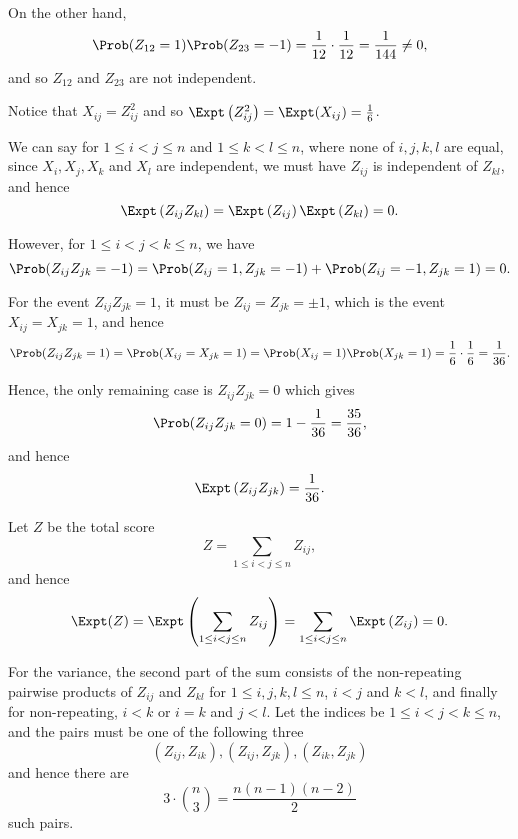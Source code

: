 \begin{enumerate}
          On the other hand,
          \[
              \Prob(Z_{12} = 1) \Prob(Z_{23} = -1) = \frac{1}{12} \cdot \frac{1}{12} = \frac{1}{144} \neq 0,
          \]
          and so \(Z_{12}\) and \(Z_{23}\) are not independent.

          Notice that \(X_{ij} = Z_{ij}^2\) and so \(\Expt\left(Z_{ij}^2\right) = \Expt(X_{ij}) = \frac{1}{6}\).

          We can say for \(1 \leq i < j \leq n\) and \(1 \leq k < l \leq n\), where none of \(i, j, k, l\) are equal, since \(X_i, X_j, X_k\) and \(X_l\) are independent, we must have \(Z_{ij}\) is independent of \(Z_{kl}\), and hence
          \[
              \Expt\left(Z_{ij} Z_{kl}\right) = \Expt\left(Z_{ij}\right) \Expt\left(Z_{kl}\right) = 0.
          \]

          However, for \(1 \leq i < j < k \leq n\), we have
          \[
              \Prob(Z_{ij} Z_{jk} = -1) = \Prob(Z_{ij} = 1, Z_{jk} = -1) + \Prob(Z_{ij} = -1, Z_{jk} = 1) = 0.
          \]

          For the event \(Z_{ij} Z_{jk} = 1\), it must be \(Z_{ij} = Z_{jk} = \pm 1\), which is the event \(X_{ij} = X_{jk} = 1\), and hence
          \[
              \Prob(Z_{ij} Z_{jk} = 1) = \Prob(X_{ij} = X_{jk} = 1) = \Prob(X_{ij} = 1) \Prob(X_{jk} = 1) = \frac{1}{6} \cdot \frac{1}{6} = \frac{1}{36}.
          \]

          Hence, the only remaining case is \(Z_{ij} Z_{jk} = 0\) which gives
          \[
              \Prob(Z_{ij} Z_{jk} = 0) = 1 - \frac{1}{36} = \frac{35}{36},
          \]
          and hence
          \[
              \Expt\left(Z_{ij} Z_{jk}\right) = \frac{1}{36}.
          \]

          Let \(Z\) be the total score
          \[
              Z = \sum_{1 \leq i < j \leq n} Z_{ij},
          \]
          and hence
          \[
              \Expt(Z) = \Expt\left(\sum_{1 \leq i < j \leq n} Z_{ij}\right) = \sum_{1 \leq i < j \leq n} \Expt\left(Z_{ij}\right) = 0.
          \]

          For the variance, the second part of the sum consists of the non-repeating pairwise products of \(Z_{ij}\) and \(Z_{kl}\) for \(1 \leq i, j, k, l \leq n\), \(i < j\) and \(k < l\), and finally for non-repeating, \(i < k\) or \(i = k\) and \(j < l\). Let the indices be \(1 \leq i < j < k \leq n\), and the pairs must be one of the following three
          \[
              \left(Z_{ij}, Z_{ik}\right), \left(Z_{ij}, Z_{jk}\right), \left(Z_{ik}, Z_{jk}\right)
          \]
          and hence there are
          \[
              3 \cdot \binom{n}{3} = \frac{n (n - 1) (n - 2)}{2}
          \]
          such pairs.


\end{enumerate}
